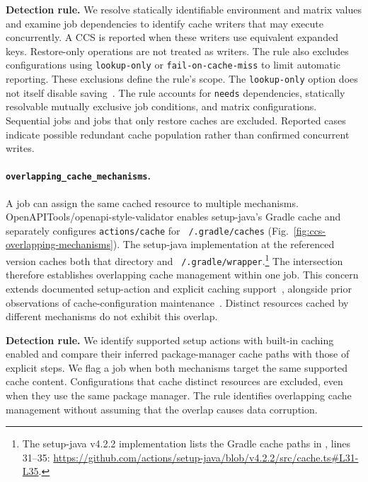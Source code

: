 \documentclass[smallextended]{svjour3}
\begin{document}
\textbf{Detection rule.}
We resolve statically identifiable environment and matrix values and examine job dependencies to identify cache writers that may execute concurrently. A CCS is reported when these writers use equivalent expanded keys. Restore-only operations are not treated as writers. The rule also excludes configurations using \texttt{lookup-only} or \texttt{fail-on-cache-miss} to limit automatic reporting. These exclusions define the rule's scope. The \texttt{lookup-only} option does not itself disable saving~\citep{gha_cache_action}. The rule accounts for \texttt{needs} dependencies, statically resolvable mutually exclusive job conditions, and matrix configurations. Sequential jobs and jobs that only restore caches are excluded. Reported cases indicate possible redundant cache population rather than confirmed concurrent writes.




\paragraph{\texttt{overlapping\_cache\_mechanisms}.}
A job can assign the same cached resource to multiple mechanisms. OpenAPITools/openapi-style-validator enables setup-java's Gradle cache and separately configures \texttt{actions/cache} for \texttt{\string~/.gradle/caches} (Fig.~\ref{fig:ccs-overlapping-mechanisms}). The setup-java implementation at the referenced version caches both that directory and \texttt{\string~/.gradle/wrapper}.\footnote{The setup-java v4.2.2 implementation lists the Gradle cache paths in , lines 31--35: \url{https://github.com/actions/setup-java/blob/v4.2.2/src/cache.ts\#L31-L35}.} The intersection therefore establishes overlapping cache management within one job. This concern extends documented setup-action and explicit caching support~\citep{gha_cache_docs}, alongside prior observations of cache-configuration maintenance~\citep{hasan2026caching}. Distinct resources cached by different mechanisms do not exhibit this overlap.



\textbf{Detection rule.}
We identify supported setup actions with built-in caching enabled and compare their inferred package-manager cache paths with those of explicit  steps. We flag a job when both mechanisms target the same supported cache content. Configurations that cache distinct resources are excluded, even when they use the same package manager. The rule identifies overlapping cache management without assuming that the overlap causes data corruption.
\end{document}
